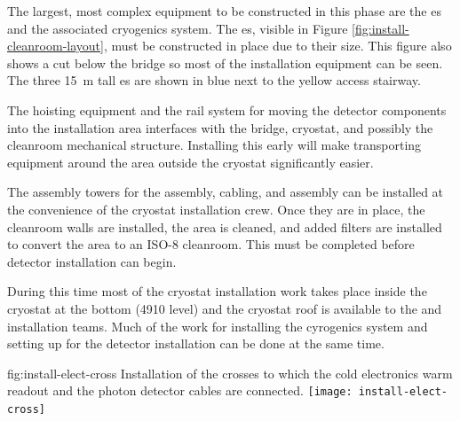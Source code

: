 The largest, most complex equipment to be constructed in this phase are the \coldbox{}es and %
the associated cryogenics system. 
The \coldbox{}es, visible in Figure \ref{fig:install-cleanroom-layout}, must be constructed in place due to their size.  
This figure also shows a cut  below the bridge so most of the installation equipment can be seen. 
The three \SI{15}{m} tall  \coldbox{}es are shown in blue next to the yellow access stairway. 

The hoisting equipment and the rail system for moving the detector components into the installation area interfaces with the bridge, cryostat, and possibly the cleanroom mechanical structure. 
Installing this early will make transporting equipment around the area outside the cryostat significantly easier. 
 
The assembly towers for the  assembly,  cabling, and  assembly can be installed at the convenience of the cryostat installation crew. Once they are in place, the cleanroom walls are installed, the area is cleaned, and added  filters are installed to convert the area to an ISO-8 cleanroom. This must be completed before detector installation can begin.

During this time %
most of the cryostat installation work takes place inside the cryostat at the bottom (4910 level) and  %
the cryostat roof is available to the  and  installation teams. 
Much of the work for installing the cyrogenics system and setting up for the detector installation %
can be done at the same time. 

\begin{dunefigure}{fig:install-elect-cross}
  {Installation of the crosses to which the cold electronics warm readout and the photon detector cables are connected.}
 \texttt{[image: install-elect-cross]}
\end{dunefigure}

